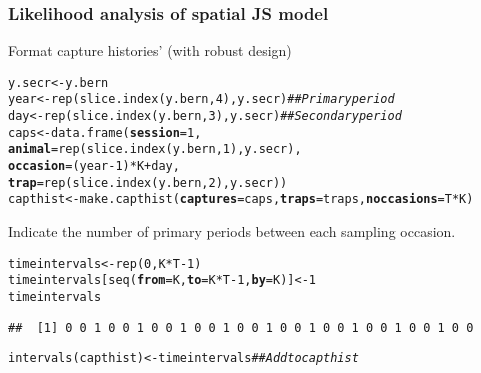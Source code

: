 \documentclass[color=usenames,dvipsnames]{beamer}\usepackage[]{graphicx}\usepackage[]{xcolor}
\makeatletter
\newcommand{\hlnum}[1]{\textcolor[rgb]{0.69,0.494,0}{#1}}%
\newcommand{\hlcom}[1]{\textcolor[rgb]{0.514,0.506,0.514}{\textit{#1}}}%
\newcommand{\hlopt}[1]{\textcolor[rgb]{0,0,0}{#1}}%
\newcommand{\hldef}[1]{\textcolor[rgb]{0,0,0}{#1}}%
\newcommand{\hlkwb}[1]{\textcolor[rgb]{0,0.341,0.682}{#1}}%
\newcommand{\hlkwc}[1]{\textcolor[rgb]{0,0,0}{\textbf{#1}}}%
\newcommand{\hlkwd}[1]{\textcolor[rgb]{0.004,0.004,0.506}{#1}}%
\newenvironment{kframe}{%
 \def\at@end@of@kframe{}%
 \ifinner\ifhmode%
  \def\at@end@of@kframe{\end{minipage}}%
  \begin{minipage}{\columnwidth}%
 \fi\fi%
 \def\FrameCommand##1{\hskip\@totalleftmargin \hskip-\fboxsep
 \colorbox{shadecolor}{##1}\hskip-\fboxsep
     \hskip-\linewidth \hskip-\@totalleftmargin \hskip\columnwidth}%
 \MakeFramed {\advance\hsize-\width
   \@totalleftmargin\z@ \linewidth\hsize
   \@setminipage}}%
 {\par\unskip\endMakeFramed%
 \at@end@of@kframe}
\newenvironment{knitrout}{}{} %
\makeatother
\begin{document}
\begin{frame}[fragile]
  \frametitle{Likelihood analysis of spatial JS model}
Format capture histories' (with robust design)
\begin{knitrout}\scriptsize
{}\color{fgcolor}\begin{kframe}
\begin{alltt}
\hldef{y.secr} \hlkwb{<-} \hldef{y.bern}
\hldef{year} \hlkwb{<-} \hlkwd{rep}\hldef{(}\hlkwd{slice.index}\hldef{(y.bern,} \hlnum{4}\hldef{), y.secr)}  \hlcom{## Primary period}
\hldef{day} \hlkwb{<-} \hlkwd{rep}\hldef{(}\hlkwd{slice.index}\hldef{(y.bern,} \hlnum{3}\hldef{), y.secr)}   \hlcom{## Secondary period }
\hldef{caps} \hlkwb{<-} \hlkwd{data.frame}\hldef{(}\hlkwc{session}\hldef{=}\hlnum{1}\hldef{,}
                   \hlkwc{animal}\hldef{=}\hlkwd{rep}\hldef{(}\hlkwd{slice.index}\hldef{(y.bern,} \hlnum{1}\hldef{), y.secr),}
                   \hlkwc{occasion}\hldef{=(year}\hlopt{-}\hlnum{1}\hldef{)}\hlopt{*}\hldef{K}\hlopt{+}\hldef{day,}
                   \hlkwc{trap}\hldef{=}\hlkwd{rep}\hldef{(}\hlkwd{slice.index}\hldef{(y.bern,} \hlnum{2}\hldef{), y.secr))}
\hldef{capthist} \hlkwb{<-} \hlkwd{make.capthist}\hldef{(}\hlkwc{captures}\hldef{=caps,} \hlkwc{traps}\hldef{=traps,} \hlkwc{noccasions}\hldef{=T}\hlopt{*}\hldef{K)}
\end{alltt}
\end{kframe}
\end{knitrout}
\vfill
Indicate the number of primary periods between each sampling occasion.
\begin{knitrout}\scriptsize
{}\color{fgcolor}\begin{kframe}
\begin{alltt}
\hldef{timeintervals} \hlkwb{<-} \hlkwd{rep}\hldef{(}\hlnum{0}\hldef{, K}\hlopt{*}\hldef{T}\hlopt{-}\hlnum{1}\hldef{)}
\hldef{timeintervals[}\hlkwd{seq}\hldef{(}\hlkwc{from}\hldef{=K,} \hlkwc{to}\hldef{=K}\hlopt{*}\hldef{T}\hlopt{-}\hlnum{1}\hldef{,} \hlkwc{by}\hldef{=K)]} \hlkwb{<-} \hlnum{1}
\hldef{timeintervals}
\end{alltt}
\begin{verbatim}
##  [1] 0 0 1 0 0 1 0 0 1 0 0 1 0 0 1 0 0 1 0 0 1 0 0 1 0 0 1 0 0
\end{verbatim}
\begin{alltt}
\hlkwd{intervals}\hldef{(capthist)} \hlkwb{<-} \hldef{timeintervals} \hlcom{## Add to capthist}
\end{alltt}
\end{kframe}
\end{knitrout}
\end{frame}
\end{document}
